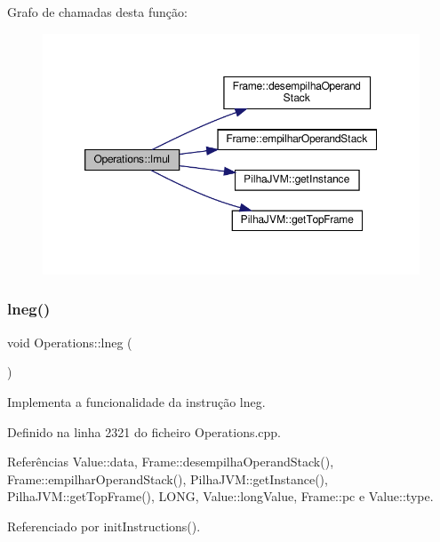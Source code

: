 Grafo de chamadas desta função\+:\nopagebreak
\begin{figure}[H]
\begin{center}
\leavevmode
\includegraphics[width=350pt]{classOperations_ae23a8dfdcc02432b6f880334fa4a7c59_cgraph}
\end{center}
\end{figure}
\mbox{\label{classOperations_a0a14cc7ee880b5d5f1c3b532e8e2117c}} 
\subsubsection{\texorpdfstring{lneg()}{lneg()}}
{\footnotesize\ttfamily void Operations\+::lneg (\begin{DoxyParamCaption}{ }\end{DoxyParamCaption})\hspace{0.3cm}{\ttfamily [private]}}



Implementa a funcionalidade da instrução lneg. 



Definido na linha 2321 do ficheiro Operations.\+cpp.



Referências Value\+::data, Frame\+::desempilha\+Operand\+Stack(), Frame\+::empilhar\+Operand\+Stack(), Pilha\+J\+V\+M\+::get\+Instance(), Pilha\+J\+V\+M\+::get\+Top\+Frame(), L\+O\+NG, Value\+::long\+Value, Frame\+::pc e Value\+::type.



Referenciado por init\+Instructions().

